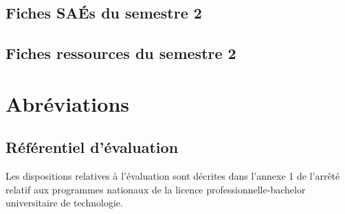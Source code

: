 \documentclass[10pt,lualatex,french]{article}
\begin{document}


\newpage

\subsection{Fiches SAÉs du semestre 2}
\affichageSAE{\sem}

\subsection{Fiches ressources du semestre 2}
\affichageRessource{\sem}

\section{Abréviations}

\begin{multicols}{2}\small

\end{multicols}

\clearpage
\subsection*{Référentiel d'évaluation}
{
    \setlength{\parindent}{0cm}
    \setlength{\parskip}{1ex}
Les dispositions relatives à l'évaluation sont décrites dans l'annexe 1 de l'arrêté relatif aux programmes nationaux de la licence professionnelle-bachelor universitaire de technologie.
}
\end{document}
